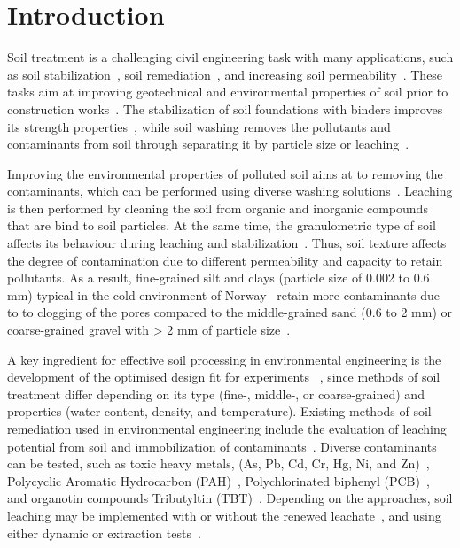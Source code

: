 \documentclass[algorithms,article,accept,pdftex,moreauthors]{Definitions/mdpi}
\begin{document}
\section{Introduction}

Soil treatment is a challenging civil engineering task with many applications, such as soil stabilization~\cite{ref1,ma16113996,Yietal2014,app13084880}, soil {remediation}~\cite{Benschoten,Chu,Bhandari}, and increasing soil permeability~\cite{Rangeard,Lemenkova202222,Schultz}. {These} tasks aim at improving geotechnical and environmental properties of soil prior {to} construction works~\cite{Mohammedetal,Zayyat,SHEOB2023,Tiwari}. {The stabilization of soil foundations }with{ binders} improves {its }strength properties~\cite{DHARINI2023,ELHARIRI202347,Eissa,ZHANG2023131887,HogentoglerWillis}{, while }soil washing removes {the }pollutants and contaminants from soil through separating {it} by particle size or leaching~\cite{Fristad,Finney,Hanson}. 

{Improving} the environmental properties of {polluted }soil {aims at} to {removing} the contaminants{, which can be performed }using{ diverse} washing solutions~\cite{He,Mizutani2016}. Leaching is then performed by cleaning the soil from organic and inorganic {compounds} that are bind to soil particles. {At the same time, the} granulometric type of soil {affects its behaviour during leaching and stabilization}~\cite{Hoang,Schaefers,Krisdani}. {Thus, soil texture affects }the degree of contamination {due to different permeability and capacity to retain pollutants. As a result, fine-grained silt and clays }(particle size of 0.002 to 0.6 mm){ typical in the cold environment of Norway}~\cite{Bache,Andersen,Zhangetal2020} retain more contaminants {due to to clogging of the pores }compared to the middle-grained {sand (}0.6 to 2 mm) or coarse-grained {gravel with >} 2 mm of particle size~\cite{Binner,Kulkarni}. 

A key ingredient for effective soil processing {in environmental engineering }is the development of the optimised design fit for experiments ~\cite{Rahinah,Ninic,Lemenkova202226,Zhang,Lemenkova202309,Wei}{, since methods} of soil treatment differ depending on {its }type (fine-, middle-, or coarse-grained) and properties (water content, density, and temperature). Existing methods of soil {remediation} used in environmental engineering include {the }evaluation of leaching potential from soil {and immobilization of contaminants}~\cite{Mohammedetal2016,Simonetal}. Diverse contaminants can be tested, such as {toxic }heavy metals, {(As, Pb, Cd, Cr, Hg, Ni, and  Zn)}~\cite{Naghipour,WangTabbaa,LiLi,Xia}, Polycyclic Aromatic Hydrocarbon (PAH)~\cite{Liang}, Polychlorinated biphenyl (PCB)~\cite{Aydilek}, and organotin compounds Tributyltin (TBT)~\cite{KUCHARSKI2022136133,Lemenkova202214,MARCIC20062322,Lemenkova202131}. Depending {on} the approaches, soil leaching may be implemented with or without the renewed {leachate}~\cite{1997579}{, and using either }dynamic or extraction tests~\cite{Lemenkova202208}. 
\end{document}
